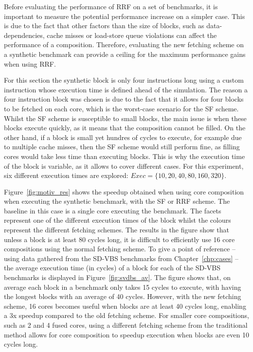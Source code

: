 Before evaluating the performance of RRF on a set of benchmarks, it is important to measure the potential performance increase on a simpler case.
This is due to the fact that other factors than the size of blocks, such as data-dependencies, cache misses or load-store queue violations can affect the performance of a composition.
Therefore, evaluating the new fetching scheme on a synthetic benchmark can provide a ceiling for the maximum performance gains when using RRF.

For this section the synthetic block is only four instructions long using a custom instruction whose execution time is defined ahead of the simulation.
The reason a four instruction block was chosen is due to the fact that it allows for four blocks to be fetched on each core, which is the worst-case scenario for the SF scheme.
Whilst the SF scheme is susceptible to small blocks, the main issue is when these blocks execute quickly, as it means that the composition cannot be filled.
On the other hand, if a block is small yet hundres of cycles to execute, for example due to multiple cache misses, then the SF scheme would still perform fine, as filling cores would take less time than executing blocks.
This is why the execution time of the block is variable, as it allows to cover different cases.
For this experiment, six different execution times are explored: $Exec=\{10,20,40,80,160,320\}$.

Figure~\ref{fig:motiv_res} shows the speedup obtained when using core composition when executing the synthetic benchmark, with the SF or RRF scheme.
The baseline in this case is a single core executing the benchmark.
The facets represent one of the different execution times of the block whilst the colours represent the different fetching schemes.
The results in the figure show that unless a block is at least 80 cycles long, it is difficult to efficiently use 16 core compositions using the normal fetching scheme.
To give a point of reference -- using data gathered from the SD-VBS benchmarks from Chapter~\ref{chp:cases} -- the average execution time (in cycles) of a block for each of the SD-VBS benchmarks is displayed in Figure~\ref{fig:svdbs_av}.
The figure shows that, on average each block in a benchmark only takes 15 cycles to execute, with  having the longest blocks with an average of 40 cycles.
However, with the new fetching scheme, 16 cores becomes useful when blocks are at least 40 cycles long, enabling a 3x speedup compared to the old fetching scheme.
For smaller core compositions, such as 2 and 4 fused cores, using a different fetching scheme from the traditional method allows for core composition to speedup execution when blocks are even 10 cycles long.
